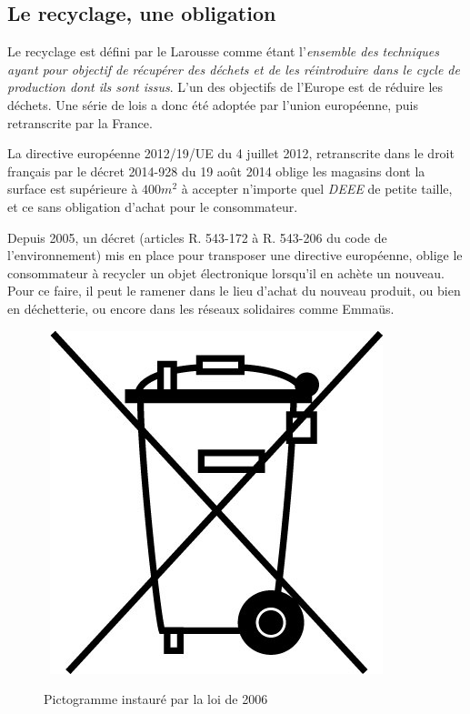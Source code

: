 \subsection{Le recyclage, une obligation}

Le recyclage est défini par le Larousse  comme étant l'\og{}\textit{ensemble des techniques ayant pour objectif de récupérer des déchets et de les réintroduire dans le cycle de production dont ils sont issus}\fg{}. L'un des objectifs de l'Europe est de réduire les déchets. Une série de lois a donc été adoptée par l'union européenne, puis retranscrite par la France. 

La directive européenne 2012/19/UE du 4 juillet 2012, retranscrite dans le droit français par le décret 2014-928 du 19 août 2014 oblige  les magasins dont la surface est supérieure à $400m^2$ à accepter n'importe quel \textit{DEEE} de petite taille, et ce sans obligation d'achat pour le consommateur. 

Depuis 2005, un décret (articles R. 543-172 à R. 543-206 du code de l'environnement) mis en place pour transposer %
 une directive européenne, oblige le consommateur à recycler un objet électronique lorsqu'il en achète un nouveau. Pour ce faire, il peut le ramener dans le lieu d'achat du nouveau produit, ou bien en déchetterie, ou encore dans les réseaux solidaires comme Emmaüs.

\begin{figure}
~\includegraphics[scale=0.33]{Rsc/pictopoubellebarree.jpg} 
\caption{Pictogramme instauré par la loi de 2006}
\label{fig::picPoubelleBarree}
\end{figure} 

